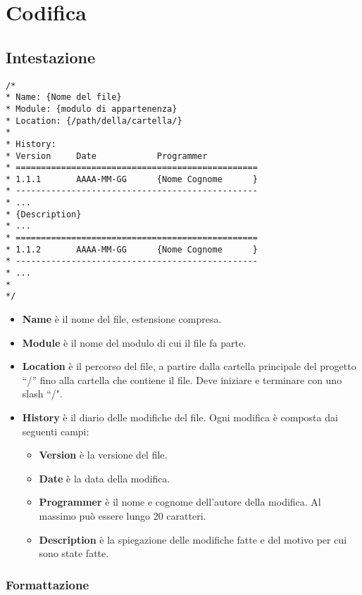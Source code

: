 \section{Codifica}

\subsection{Intestazione}

\begin{lstlisting}
/*
* Name: {Nome del file}
* Module: {modulo di appartenenza}
* Location: {/path/della/cartella/}
*
* History:
* Version     Date            Programmer    
* ================================================
* 1.1.1       AAAA-MM-GG      {Nome Cognome      }
* ------------------------------------------------
* ...
* {Description}
* ...
* ================================================
* 1.1.2       AAAA-MM-GG      {Nome Cognome      }
* ------------------------------------------------
* ...
*
*/
\end{lstlisting}

\begin{itemize}
 \item \textbf{Name} è il nome del file, estensione compresa.
 \item \textbf{Module} è il nome del modulo di cui il file fa parte.
 \item \textbf{Location} è il percorso del file, a partire dalla cartella principale del progetto ``/'' fino alla cartella che contiene il file. Deve iniziare e terminare con uno slash ``/".
 \item \textbf{History} è il diario delle modifiche del file. Ogni modifica è composta dai seguenti campi:
 
	\begin{itemize}
	 \item \textbf{Version} è la versione del file.
	 \item \textbf{Date} è la data della modifica.
	 \item \textbf{Programmer} è il nome e cognome dell'autore della modifica. Al massimo può essere lungo 20 caratteri.
	 \item \textbf{Description} è la spiegazione delle modifiche fatte e del motivo per cui sono state fatte.	 
	\end{itemize}
\end{itemize}

\subsubsection{Formattazione}

